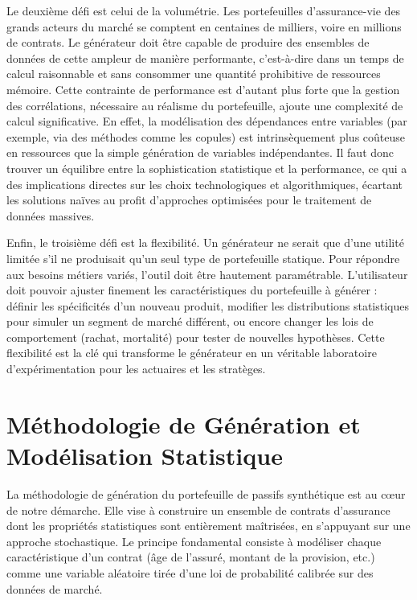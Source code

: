 Le deuxième défi est celui de la volumétrie. Les portefeuilles d'assurance-vie des grands acteurs du marché se comptent en centaines de milliers, voire en millions de contrats. Le générateur doit être capable de produire des ensembles de données de cette ampleur de manière performante, c'est-à-dire dans un temps de calcul raisonnable et sans consommer une quantité prohibitive de ressources mémoire. Cette contrainte de performance est d'autant plus forte que la gestion des corrélations, nécessaire au réalisme du portefeuille, ajoute une complexité de calcul significative. En effet, la modélisation des dépendances entre variables (par exemple, via des méthodes comme les copules) est intrinsèquement plus coûteuse en ressources que la simple génération de variables indépendantes. Il faut donc trouver un équilibre entre la sophistication statistique et la performance, ce qui a des implications directes sur les choix technologiques et algorithmiques, écartant les solutions naïves au profit d'approches optimisées pour le traitement de données massives.

Enfin, le troisième défi est la flexibilité. Un générateur ne serait que d'une utilité limitée s'il ne produisait qu'un seul type de portefeuille statique. Pour répondre aux besoins métiers variés, l'outil doit être hautement paramétrable. L'utilisateur doit pouvoir ajuster finement les caractéristiques du portefeuille à générer : définir les spécificités d'un nouveau produit, modifier les distributions statistiques pour simuler un segment de marché différent, ou encore changer les lois de comportement (rachat, mortalité) pour tester de nouvelles hypothèses. Cette flexibilité est la clé qui transforme le générateur en un véritable laboratoire d'expérimentation pour les actuaires et les stratèges.


\section{Méthodologie de Génération et Modélisation Statistique}

La méthodologie de génération du portefeuille de passifs synthétique est au cœur de notre démarche. Elle vise à construire un ensemble de contrats d'assurance dont les propriétés statistiques sont entièrement maîtrisées, en s'appuyant sur une approche stochastique. Le principe fondamental consiste à modéliser chaque caractéristique d'un contrat (âge de l'assuré, montant de la provision, etc.) comme une variable aléatoire tirée d'une loi de probabilité calibrée sur des données de marché.


